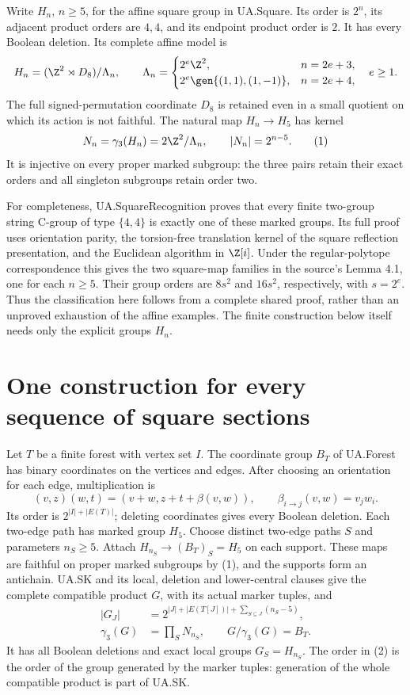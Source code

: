 Write $H_n$, $n\ge5$, for the affine square group in UA.Square. Its order
is $2^n$, its adjacent product orders are $4,4$, and its endpoint product
order is $2$. It has every Boolean deletion. Its complete affine model is
\[
 H_n=(\Z^2\rtimes D_8)/\Lambda_n,\qquad
 \Lambda_n=\begin{cases}
 2^e\Z^2,&n=2e+3,\\
 2^e\gen{(1,1),(1,-1)},&n=2e+4,
 \end{cases}\quad e\ge1.
\]
The full signed-permutation coordinate $D_8$ is retained even in a small
quotient on which its action is not faithful. The natural map $H_n\to H_5$
has kernel
\[
 N_n=\gamma_3(H_n)=2\Z^2/\Lambda_n,
 \qquad |N_n|=2^{n-5}.                                  \tag{1}
\]
It is injective on every proper marked subgroup: the three pairs retain
their exact orders and all singleton subgroups retain order two.

For completeness, UA.SquareRecognition proves that every finite two-group
string C-group of type $\{4,4\}$ is exactly one of these marked groups.
Its full proof uses orientation parity, the torsion-free translation kernel
of the square reflection presentation, and the Euclidean algorithm in
$\Z[i]$. Under the regular-polytope correspondence this gives the two
square-map families in the source's Lemma 4.1, one for each $n\ge5$.
Their group orders are $8s^2$ and $16s^2$, respectively, with $s=2^e$.
Thus the classification here follows from a complete shared proof, rather
than an unproved exhaustion of the affine examples. The finite construction
below itself needs only the explicit groups $H_n$.

\section{One construction for every sequence of square sections}
Let $T$ be a finite forest with vertex set $I$. The coordinate group
$B_T$ of UA.Forest has binary coordinates on the vertices and edges. After
choosing an orientation for each edge, multiplication is
\[
 (v,z)(w,t)=(v+w,z+t+\beta(v,w)),\qquad
 \beta_{i\to j}(v,w)=v_jw_i.
\]
Its order is $2^{|I|+|E(T)|}$; deleting coordinates gives every Boolean
deletion. Each two-edge path has marked group $H_5$.
Choose distinct two-edge paths $S$ and parameters $n_S\ge5$. Attach
$H_{n_S}\to (B_T)_S=H_5$ on each support. These maps are faithful on proper
marked subgroups by (1), and the supports form an antichain. UA.SK and its
local, deletion and lower-central clauses give the complete compatible
product $G$, with its actual marker tuples, and
\begin{align}
 |G_J|&=2^{|J|+|E(T[J])|+\sum_{S\subseteq J}(n_S-5)},       \tag{2}\\
 \gamma_3(G)&=\prod_S N_{n_S},\qquad G/\gamma_3(G)=B_T.     \tag{3}
\end{align}
It has all Boolean deletions and exact local groups $G_S=H_{n_S}$.
The order in (2) is the order of the group generated by the marker tuples:
generation of the whole compatible product is part of UA.SK.

